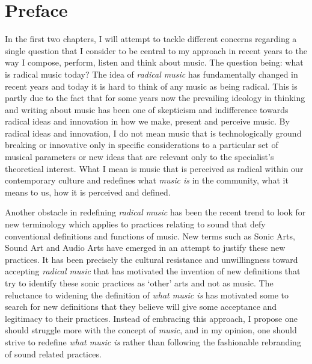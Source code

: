 \chapter{Preface}




In the first two chapters, I will attempt to tackle different concerns regarding a single question that I consider to be central to my approach in recent years to the way I compose, perform, listen and think about music. The question being: what is radical music today? The idea of \emph{radical music} has fundamentally changed in recent years and today it is hard to think of any music as being radical. This is partly due to the fact that for some years now the prevailing ideology in thinking and writing about music has been one of skepticism and indifference towards radical ideas and innovation in how we make, present and perceive music. By radical ideas and innovation, I do not mean music that is technologically ground breaking or innovative only in specific considerations to a particular set of musical parameters or new ideas that are relevant only to the specialist's theoretical interest. What I mean is music that is perceived as radical within our contemporary culture and redefines what \emph{music is} in the community, what it means to us, how it is perceived and defined.

Another obstacle in redefining \emph{radical music} has been the recent trend to look for new terminology which applies to practices relating to sound that defy conventional definitions and functions of music. New terms such as Sonic Arts, Sound Art and Audio Arts have emerged in an attempt to justify these new practices. It has been precisely the cultural resistance and unwillingness toward accepting \emph{radical music} that has motivated the invention of new definitions that try to identify these sonic practices as `other' arts and not as music. The reluctance to widening the definition of \emph{what music is} has motivated some to search for new definitions that they believe will give some acceptance and legitimacy to their practices. Instead of embracing this approach, I propose one should struggle more with the concept of \emph{music}, and in my opinion, one should strive to redefine \emph{what music is} rather than following the fashionable rebranding of sound related practices. 

